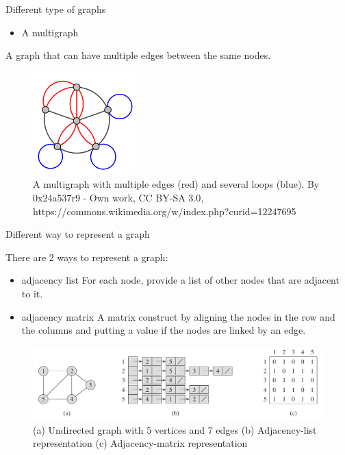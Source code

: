 \documentclass[ignorenonframetext,]{beamer}
\providecommand{\tightlist}{%
  \setlength{\itemsep}{0pt}\setlength{\parskip}{0pt}}
\begin{document}
\begin{frame}{Different type of graphs}
\protect\hypertarget{different-type-of-graphs-4}{}

\begin{itemize}
\tightlist
\item
  A multigraph
\end{itemize}

A graph that can have multiple edges between the same nodes.

\begin{figure}
\centering
\includegraphics[width=\textwidth,height=1.5625in]{Multi-pseudograph.png}
\caption{A multigraph with multiple edges (red) and several loops
(blue). By 0x24a537r9 - Own work, CC BY-SA 3.0,
https://commons.wikimedia.org/w/index.php?curid=12247695}
\end{figure}

\end{frame}

\begin{frame}{Different way to represent a graph}
\protect\hypertarget{different-way-to-represent-a-graph}{}

There are 2 ways to represent a graph:

\begin{itemize}
\tightlist
\item
  adjacency list For each node, provide a list of other nodes that are
  adjacent to it.
\item
  adjacency matrix A matrix construct by aligning the nodes in the row
  and the columns and putting a value if the nodes are linked by an
  edge.
\end{itemize}

\begin{figure}
\centering
\includegraphics{graph-representation.png}
\caption{(a) Undirected graph with 5 vertices and 7 edges (b)
Adjacency-list representation (c) Adjacency-matrix representation}
\end{figure}

\end{frame}
\end{document}
